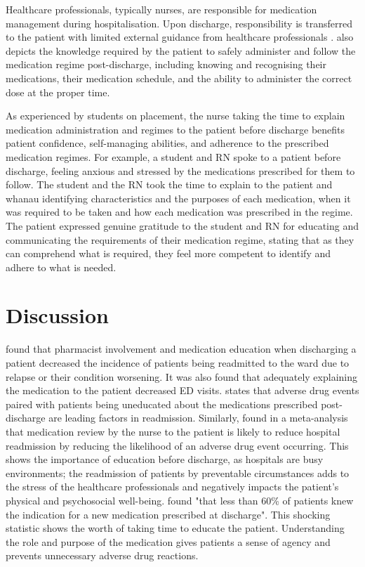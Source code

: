 \documentclass[british,12pt,a4paper]{article}
\begin{document}
Healthcare professionals, typically nurses, are responsible for medication management during hospitalisation. Upon discharge, responsibility is transferred to the patient with limited external guidance from healthcare professionals \parencite{Mortelmans2021}. \textcite{Mortelmans2021} also depicts the knowledge required by the patient to safely administer and follow the medication regime post-discharge, including knowing and recognising their medications, their medication schedule, and the ability to administer the correct dose at the proper time.

As experienced by students on placement, the nurse taking the time to explain medication administration and regimes to the patient before discharge benefits patient confidence, self-managing abilities, and adherence to the prescribed medication regimes. For example, a student and RN spoke to a patient before discharge, feeling anxious and stressed by the medications prescribed for them to follow. The student and the RN took the time to explain to the patient and whanau identifying characteristics and the purposes of each medication, when it was required to be taken and how each medication was prescribed in the regime. The patient expressed genuine gratitude to the student and RN for educating and communicating the requirements of their medication regime, stating that as they can comprehend what is required, they feel more competent to identify and adhere to what is needed.

\section{Discussion}
\textcite{Phatak2015} found that pharmacist involvement and medication education when discharging a patient decreased the incidence of patients being readmitted to the ward due to relapse or their condition worsening. It was also found that adequately explaining the medication to the patient decreased ED visits. \citeauthor{Phatak2015} states that adverse drug events paired with patients being uneducated about the medications prescribed post-discharge are leading factors in readmission. Similarly, \textcite{Alper2023} found in a meta-analysis that medication review by the nurse to the patient is likely to reduce hospital readmission by reducing the likelihood of an adverse drug event occurring. This shows the importance of education before discharge, as hospitals are busy environments; the readmission of patients by preventable circumstances adds to the stress of the healthcare professionals and negatively impacts the patient's physical and psychosocial well-being. \citeauthor{Phatak2015} found "that less than 60\% of patients knew the indication for a new medication prescribed at discharge". This shocking statistic shows the worth of taking time to educate the patient. Understanding the role and purpose of the medication gives patients a sense of agency and prevents unnecessary adverse drug reactions.
\end{document}
